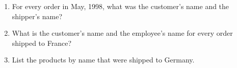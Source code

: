 \documentclass{article}
\begin{document}
\begin{enumerate}
            \item For every order in May, 1998, what was the customer's name and the shipper's name?
            \item What is the customer's name and the employee's name for every order shipped to France?
            \item List the products by name that were shipped to Germany.
        \end{enumerate}
\end{document}
